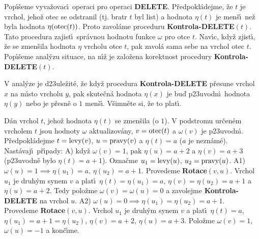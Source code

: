 \flushpar Pop\'\i\v seme vyva\v zovac\'\i\ operaci pro operaci 
{\bf DELETE}.  P\v red\-po\-kl\'adejme, \v ze $t$ je vrchol, jeho\v z otec se 
odstranil (tj.  bratr $t$ byl list) a hodnota $\eta (t)$ je men\v s\'\i\ 
ne\v z byla hodnota $\eta (\operatorname{otec}(t))$.  Proto zavol\'ame proceduru 
{\bf Kontrola-DELETE$(t)$}.  Tato procedura zajist\'\i\ spr\'avnou 
hodnotu funkce $\omega$ pro otce $t$.  Nav\'\i c, kdy\v z zjist\'\i , \v ze se 
zmen\v sila hodnota $\eta$ vrcholu otce $t$, pak zavol\'a sama sebe 
na vrchol otec $t$. Pop\'\i\v seme anal\'yzu situace, na n\'\i\v z je 
zalo\v zena korektnost procedury {\bf Kontrola-DELETE$(t)$}.  
\medskip

\flushpar V anal\'yze je d\accent23ule\v zit\'e, \v ze kdy\v z procedura {\bf Kontrola-DELETE }
p\v resune vrchol $x$ na m\'\i sto vrcholu $y$, pak skute\v cn\'a hodnota $
\eta (x)$ 
je bu\v d p\accent23uvodn\'\i\ hodnota $\eta (y)$ nebo je p\v resn\v e o $
1$ men\v s\'\i . V\v simn\v ete si, \v ze to plat\'\i . 
\medskip

\flushpar D\'an vrchol $t$, jeho\v z hodnota $\eta (t)$ se zmen\v sila (o $
1$).  V 
podstromu ur\v cen\'em vrcholem $t$ jsou hodnoty $\omega$ aktualizov\'any, 
$v=\operatorname{otec}(t)$ a $\omega (v)$ je p\accent23uvodn\'\i .  P\v redpokl\'adejme 
$t=\operatorname{levy}(v)$, $u=\operatorname{pravy}(v)$ a $\eta (t)=a$ ($a$ je nezn\'am\'e).  Nast\'avaj\'\i\ 
p\v r\'\i pady:\newline 
A) kdy\v z $\omega (v)=1$, pak $\eta (u)=a+2$ a $\eta (v)=a+3$ (p\accent23uvodn\v e 
bylo $\eta (t)=a+1$).  Ozna\v cme $u_1=\operatorname{levy}(u)$, $u_2=\operatorname{pravy}(u)$.\newline 
A1) $\omega (u)=1\implies\eta (u_1)=a,\,\eta (u_2)=a+1$.  Provedeme 
{\bf Rotace$(v,u)$}.  
Vrchol $u_1$ je druh\'ym synem $v$ a plat\'\i\ $\eta (t)=\eta (u_
1)=a$, 
$\eta (v)=\eta (u_2)=a+1$ a $\eta (u)=a+2$.  Tedy polo\v zme $\omega 
(v)=\omega (u)=0$ a 
zavolejme {\bf Kontrola-DELETE} na vrchol $u$.\newline 
A2) $\omega (u)=0\implies\eta (u_1)=\eta (u_2)=a+1$. Provedeme 
{\bf Rotace$(v,u)$}. Vrchol $u_1$ je druh\'ym synem $v$ a plat\'\i\ 
$\eta (t)=a$, $\eta (u_1)=a+1=\eta (u_2)$, $\eta (v)=a+2$, $\eta 
(u)=a+3$. Polo\v zme 
$\omega (v)=1$, $\omega (u)=-1$ a kon\v c\'\i me.
\medskip
 
